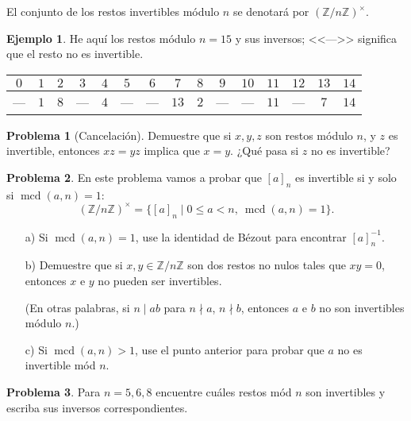 \documentclass{article}
\newcommand{\ZZ}{\mathbb{Z}}
\DeclareMathOperator{\mcd}{mcd}
\theoremstyle{definition}
\newtheorem{problema}{Problema}[section]
\newtheorem*{ejemplo}{Ejemplo}
\begin{document}
El conjunto de los restos invertibles módulo $n$ se denotará por
$(\ZZ/n\ZZ)^\times$.

\begin{ejemplo}
  He aquí los restos módulo $n = 15$ y sus inversos; <<--->> significa que el
  resto no es invertible.

  \begin{center}
    \begin{tabular}{ccccccccccccccc}
      \hline
      $0$ & $1$ & $2$ & $3$ & $4$ & $5$ & $6$ & $7$ & $8$ & $9$ & $10$ & $11$ & $12$ & $13$ & $14$ \\
      \hline
      --- & $1$ & $8$ & --- & $4$ & --- & --- & $13$ & $2$ & --- & --- & $11$ & --- & $7$ & $14$ \\
      \hline
    \end{tabular}
  \end{center}
\end{ejemplo}

\begin{problema}[Cancelación]
  Demuestre que si $x,y,z$ son restos módulo $n$, y $z$ es invertible,
  entonces $xz = yz$ implica que $x = y$.
  ¿Qué pasa si $z$ no es invertible?
\end{problema}

\begin{problema}
  \label{probl:invertible-coprimo}
  En este problema vamos a probar que $[a]_n$ es invertible si y solo si
  $\mcd (a,n) = 1$:
  \[ (\ZZ/n\ZZ)^\times = \{ [a]_n \mid 0 \le a < n, ~ \mcd (a,n) = 1 \}. \]

  \begin{enumerate}
  \item[a)] Si $\mcd (a,n) = 1$, use la identidad de Bézout para encontrar
    $[a]_n^{-1}$.

  \item[b)] Demuestre que si $x,y \in \ZZ/n\ZZ$ son dos restos no nulos tales
    que $xy = 0$, entonces $x$ e $y$ no pueden ser invertibles.

    (En otras palabras, si $n \mid ab$ para $n \nmid a$, $n \nmid b$, entonces
    $a$ e $b$ no son invertibles módulo $n$.)

  \item[c)] Si $\mcd (a,n) > 1$, use el punto anterior para probar que $a$ no es
    invertible mód $n$.
  \end{enumerate}
\end{problema}

\begin{problema}
  Para $n = 5, 6, 8$ encuentre cuáles restos mód $n$ son invertibles y
  escriba sus inversos correspondientes.
\end{problema}
\end{document}
